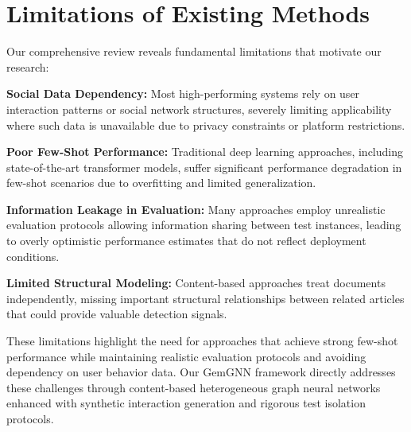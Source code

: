 \section{Limitations of Existing Methods}

Our comprehensive review reveals fundamental limitations that motivate our research:

\textbf{Social Data Dependency:} Most high-performing systems rely on user interaction patterns or social network structures, severely limiting applicability where such data is unavailable due to privacy constraints or platform restrictions.

\textbf{Poor Few-Shot Performance:} Traditional deep learning approaches, including state-of-the-art transformer models, suffer significant performance degradation in few-shot scenarios due to overfitting and limited generalization.

\textbf{Information Leakage in Evaluation:} Many approaches employ unrealistic evaluation protocols allowing information sharing between test instances, leading to overly optimistic performance estimates that do not reflect deployment conditions.

\textbf{Limited Structural Modeling:} Content-based approaches treat documents independently, missing important structural relationships between related articles that could provide valuable detection signals.

These limitations highlight the need for approaches that achieve strong few-shot performance while maintaining realistic evaluation protocols and avoiding dependency on user behavior data. Our GemGNN framework directly addresses these challenges through content-based heterogeneous graph neural networks enhanced with synthetic interaction generation and rigorous test isolation protocols.

\EndChapter
